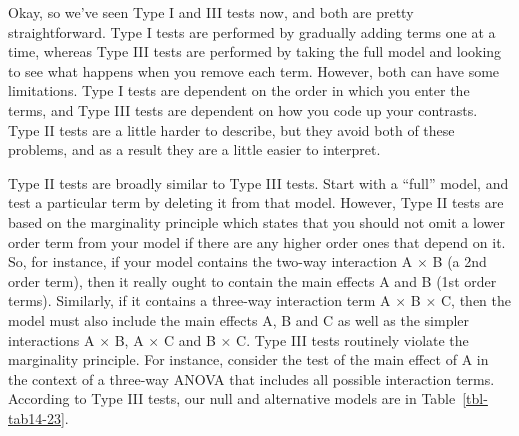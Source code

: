 \documentclass[
  a4paper,
]{book}
\begin{document}
Okay, so we've seen Type I and III tests now, and both are pretty
straightforward. Type I tests are performed by gradually adding terms
one at a time, whereas Type III tests are performed by taking the full
model and looking to see what happens when you remove each term.
However, both can have some limitations. Type I tests are dependent on
the order in which you enter the terms, and Type III tests are dependent
on how you code up your contrasts. Type II tests are a little harder to
describe, but they avoid both of these problems, and as a result they
are a little easier to interpret.

Type II tests are broadly similar to Type III tests. Start with a
``full'' model, and test a particular term by deleting it from that
model. However, Type II tests are based on the marginality principle
which states that you should not omit a lower order term from your model
if there are any higher order ones that depend on it. So, for instance,
if your model contains the two-way interaction A \(\times\) B (a 2nd
order term), then it really ought to contain the main effects A and B
(1st order terms). Similarly, if it contains a three-way interaction
term A \(\times\) B \(\times\) C, then the model must also include the
main effects A, B and C as well as the simpler interactions A \(\times\)
B, A \(\times\) C and B \(\times\) C. Type III tests routinely violate
the marginality principle. For instance, consider the test of the main
effect of A in the context of a three-way ANOVA that includes all
possible interaction terms. According to Type III tests, our null and
alternative models are in Table~\ref{tbl-tab14-23}.

\hypertarget{tbl-tab14-23}{}
 
  \providecommand{\huxb}[2]{\arrayrulecolor[RGB]{#1}\global\arrayrulewidth=#2pt}
  \providecommand{\huxvb}[2]{\color[RGB]{#1}\vrule width #2pt}
  \providecommand{\huxtpad}[1]{\rule{0pt}{#1}}
  \providecommand{\huxbpad}[1]{\rule[-#1]{0pt}{#1}}
\end{document}

